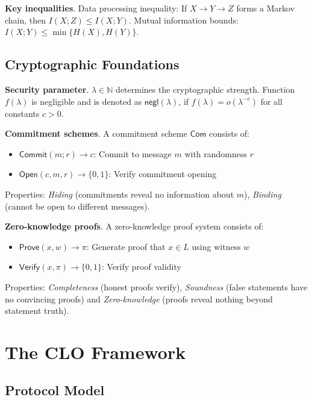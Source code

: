 \documentclass{ieeeaccess}
\begin{document}
\textbf{Key inequalities}. Data processing inequality: If $X \to Y \to Z$ forms a Markov chain, then $I(X;Z) \leq I(X;Y)$. Mutual information bounds: $I(X;Y) \leq \min\{H(X), H(Y)\}$.

\subsection{Cryptographic Foundations}

\textbf{Security parameter}. $\lambda \in \mathbb{N}$ determines the cryptographic strength. Function $f(\lambda)$ is negligible and is denoted as $\mathsf{negl}(\lambda)$, if $f(\lambda) = o(\lambda^{-c})$ for all constants $c > 0$.

\textbf{Commitment schemes}. A commitment scheme $\mathsf{Com}$ consists of:
\begin{itemize}
\item $\mathsf{Commit}(m;r) \to c$: Commit to message $m$ with randomness $r$
\item $\mathsf{Open}(c,m,r) \to \{0,1\}$: Verify commitment opening
\end{itemize}
Properties: \emph{Hiding} (commitments reveal no information about $m$), \emph{Binding} (cannot be open to different messages).

\textbf{Zero-knowledge proofs}. A zero-knowledge proof system consists of:
\begin{itemize}
\item $\mathsf{Prove}(x,w) \to \pi$: Generate proof that $x \in L$ using witness $w$
\item $\mathsf{Verify}(x,\pi) \to \{0,1\}$: Verify proof validity
\end{itemize}
Properties: \emph{Completeness} (honest proofs verify), \emph{Soundness} (false statements have no convincing proofs) and \emph{Zero-knowledge} (proofs reveal nothing beyond statement truth).

\section{The CLO Framework}\label{sec:clo_framework}

\subsection{Protocol Model}
\end{document}
